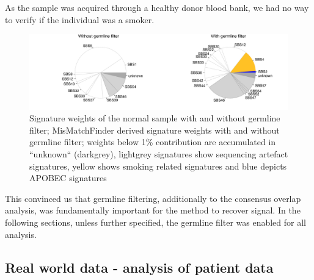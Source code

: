 As the sample was acquired through a healthy donor blood bank, we had no way to verify if the individual was a smoker.

\begin{figure}[ht]
\centering
\includegraphics[width=.99\linewidth]{Figures/MisMatchFinder/noGermlineFilterSignaturesPieChart.pdf}
\caption[Signature weights of the normal sample with and without germline filter]{Signature weights of the normal sample with and without germline filter; MisMatchFinder derived signature weights with and without germline filter; weights below 1\% contribution are accumulated in ``unknown`` (darkgrey), lightgrey signatures show sequencing artefact signatures, yellow shows smoking related signatures and blue depicts APOBEC signatures}\label{fig:mmf-noGermlinePie}
\end{figure}
 
This convinced us that germline filtering, additionally to the consensus overlap analysis, was fundamentally important for the method to recover signal. In the following sections, unless further specified, the germline filter was enabled for all analysis.


\subsection{Real world data - analysis of patient data}
\label{mmf-sec:realworld}

